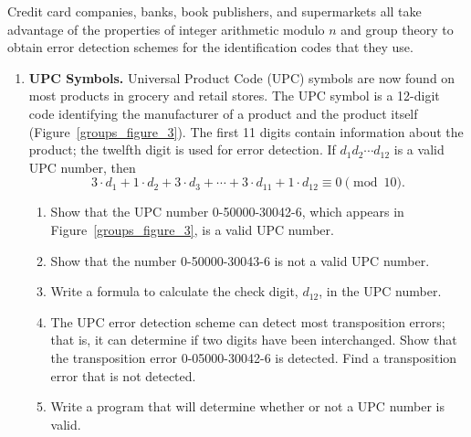  
{\small
Credit card companies, banks, book publishers, and supermarkets all
take advantage of the properties of integer arithmetic modulo $n$ and
group theory to obtain error detection schemes for the identification
codes that they use. 
\begin{enumerate}
 


\item
{\bf UPC Symbols.}
Universal Product
Code (UPC) symbols are now found on most
products in grocery and retail stores. The UPC symbol is a 12-digit
code identifying the manufacturer of a product and the product itself
(Figure~\ref{groups_figure_3}). The first 11 digits contain information about the
product; the twelfth digit is used for error detection. If $d_1 d_2
\cdots d_{12}$ is a valid UPC number, then  
\[
3 \cdot d_1 + 1 \cdot d_2 + 3 \cdot d_3 + \cdots + 3 \cdot
d_{11} + 1 \cdot d_{12} \equiv 0 \pmod{10}.
\]
\begin{enumerate}
 
\item
Show that the UPC number  0-50000-30042-6, which appears in
Figure~\ref{groups_figure_3}, is a valid UPC number. 
 
\item
Show that the number 0-50000-30043-6 is not a valid UPC number.
 
\item
Write a  formula to calculate the check digit, $d_{12}$, in the UPC number. 
 
\item
The  UPC error detection scheme can detect most transposition errors; that is, it can determine if two digits have been interchanged.  Show that the transposition error 0-05000-30042-6 is detected.  Find a transposition error that is not detected. 
 
\item
Write a program that will determine whether or not a UPC number is valid. 
 
\end{enumerate}
 

\end{enumerate}}
